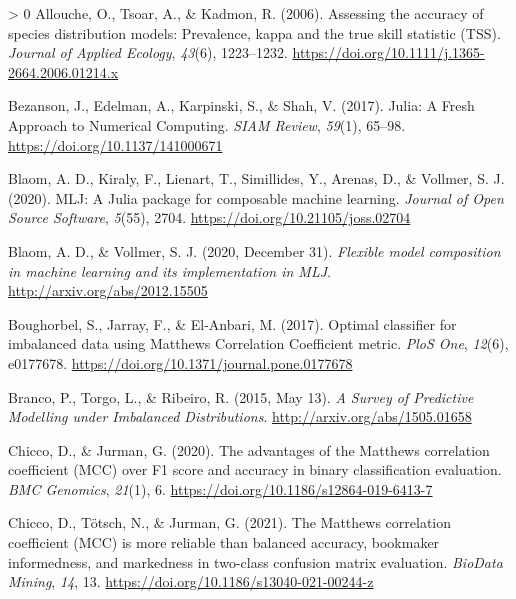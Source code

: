 \documentclass[11pt]{article}
\newlength{\cslhangindent}
\newenvironment{CSLReferences}[3] %
 {%
  \setlength{\parindent}{0pt}
  \ifodd #1 \everypar{\setlength{\hangindent}{\cslhangindent}}\ignorespaces\fi
  \ifnum #2 > 0
  \setlength{\parskip}{#2\baselineskip}
  \fi
 }%
 {}
\begin{document}
\hypertarget{refs}{}
\begin{CSLReferences}{1}{0}
\leavevmode\hypertarget{ref-Allouche2006AssAcc}{}%
Allouche, O., Tsoar, A., \& Kadmon, R. (2006). Assessing the accuracy of
species distribution models: Prevalence, kappa and the true skill
statistic (TSS). \emph{Journal of Applied Ecology}, \emph{43}(6),
1223--1232. \url{https://doi.org/10.1111/j.1365-2664.2006.01214.x}

\leavevmode\hypertarget{ref-Bezanson2017JulFre}{}%
Bezanson, J., Edelman, A., Karpinski, S., \& Shah, V. (2017). Julia: A
Fresh Approach to Numerical Computing. \emph{SIAM Review}, \emph{59}(1),
65--98. \url{https://doi.org/10.1137/141000671}

\leavevmode\hypertarget{ref-Blaom2020MljJul}{}%
Blaom, A. D., Kiraly, F., Lienart, T., Simillides, Y., Arenas, D., \&
Vollmer, S. J. (2020). MLJ: A Julia package for composable machine
learning. \emph{Journal of Open Source Software}, \emph{5}(55), 2704.
\url{https://doi.org/10.21105/joss.02704}

\leavevmode\hypertarget{ref-Blaom2020FleMod}{}%
Blaom, A. D., \& Vollmer, S. J. (2020, December 31). \emph{Flexible
model composition in machine learning and its implementation in MLJ}.
\url{http://arxiv.org/abs/2012.15505}

\leavevmode\hypertarget{ref-Boughorbel2017OptCla}{}%
Boughorbel, S., Jarray, F., \& El-Anbari, M. (2017). Optimal classifier
for imbalanced data using Matthews Correlation Coefficient metric.
\emph{PloS One}, \emph{12}(6), e0177678.
\url{https://doi.org/10.1371/journal.pone.0177678}

\leavevmode\hypertarget{ref-Branco2015SurPre}{}%
Branco, P., Torgo, L., \& Ribeiro, R. (2015, May 13). \emph{A Survey of
Predictive Modelling under Imbalanced Distributions}.
\url{http://arxiv.org/abs/1505.01658}

\leavevmode\hypertarget{ref-Chicco2020AdvMat}{}%
Chicco, D., \& Jurman, G. (2020). The advantages of the Matthews
correlation coefficient (MCC) over F1 score and accuracy in binary
classification evaluation. \emph{BMC Genomics}, \emph{21}(1), 6.
\url{https://doi.org/10.1186/s12864-019-6413-7}

\leavevmode\hypertarget{ref-Chicco2021MatCor}{}%
Chicco, D., Tötsch, N., \& Jurman, G. (2021). The Matthews correlation
coefficient (MCC) is more reliable than balanced accuracy, bookmaker
informedness, and markedness in two-class confusion matrix evaluation.
\emph{BioData Mining}, \emph{14}, 13.
\url{https://doi.org/10.1186/s13040-021-00244-z}


\end{CSLReferences}
\end{document}
